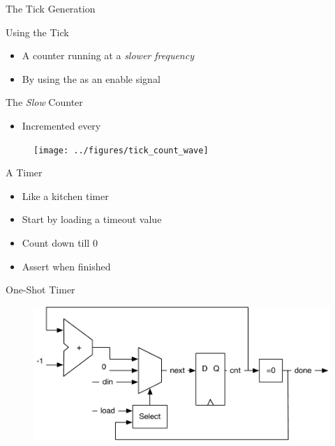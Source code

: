 \begin{frame}[fragile]{The Tick Generation}
\end{frame}

\begin{frame}[fragile]{Using the Tick}
\begin{itemize}
\item A counter running at a \emph{slower frequency}
\item By using the  as an enable signal
\end{itemize}
\end{frame}

\begin{frame}[fragile]{The \emph{Slow} Counter}
\begin{itemize}
\item Incremented every 
\end{itemize}
\begin{figure}
  \texttt{[image: ../figures/tick\_count\_wave]}
\end{figure}
\end{frame}

\begin{frame}[fragile]{A Timer}
\begin{itemize}
\item Like a kitchen timer
\item Start by loading a timeout value
\item Count down till 0
\item Assert  when finished
\end{itemize}
\end{frame}

\begin{frame}[fragile]{One-Shot Timer}
\begin{figure}
  \includegraphics[scale=\scale]{../figures/timer}
\end{figure}
\end{frame}

